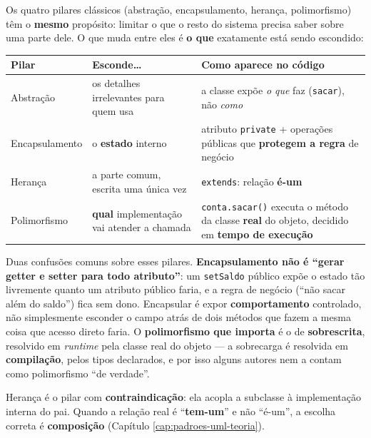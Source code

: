 \begin{conceito}
Os quatro pilares clássicos (abstração, encapsulamento, herança,
polimorfismo) têm o \textbf{mesmo} propósito: limitar o que o resto do
sistema precisa saber sobre uma parte dele. O que muda entre eles é
\textbf{o que} exatamente está sendo escondido:

\begin{center}
\begin{tabular}{@{}p{2.7cm}p{4.1cm}p{4.5cm}@{}}
\toprule
\textbf{Pilar} & \textbf{Esconde\ldots} & \textbf{Como aparece no código} \\
\midrule
Abstração & os detalhes irrelevantes para quem usa & a classe expõe
\textit{o que} faz (\texttt{sacar}), não \textit{como} \\
Encapsulamento & o \textbf{estado} interno & atributo \texttt{private} +
operações públicas que \textbf{protegem a regra} de negócio \\
Herança & a parte comum, escrita uma única vez & \texttt{extends}:
relação \textbf{é-um} \\
Polimorfismo & \textbf{qual} implementação vai atender a chamada &
\texttt{conta.sacar()} executa o método da classe \textbf{real} do
objeto, decidido em \textbf{tempo de execução} \\
\bottomrule
\end{tabular}
\end{center}

Duas confusões comuns sobre esses pilares. \textbf{Encapsulamento não é
“gerar getter e setter para todo atributo”}: um \texttt{setSaldo} público
expõe o estado tão livremente quanto um atributo público faria, e a regra
de negócio (“não sacar além do saldo”) fica sem dono. Encapsular é expor
\textbf{comportamento} controlado, não simplesmente esconder o campo atrás
de dois métodos que fazem a mesma coisa que acesso direto faria. O
\textbf{polimorfismo que importa} é o de \textbf{sobrescrita}, resolvido
em \textit{runtime} pela classe real do objeto --- a sobrecarga é
resolvida em \textbf{compilação}, pelos tipos declarados, e por isso
alguns autores nem a contam como polimorfismo “de verdade”.

Herança é o pilar com \textbf{contraindicação}: ela acopla a subclasse à
implementação interna do pai. Quando a relação real é “\textbf{tem-um}” e
não “é-um”, a escolha correta é \textbf{composição} (Capítulo
\ref{cap:padroes-uml-teoria}).
\end{conceito}

